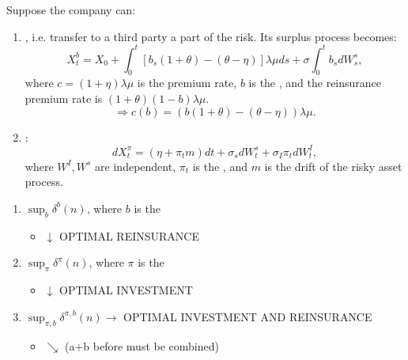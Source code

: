 Suppose the company can:

\begin{enumerate}[label=(\alph*)]
    \item {}, i.e. transfer to a third party a part of the risk. Its surplus process becomes:
    \begin{equation*}
        X_t^b = X_0 + \int_0^t [b_s(1+\theta) - (\theta - \eta)] \lambda \mu ds + \sigma \int_0^t b_s dW_s^s,
    \end{equation*}
    where $c = (1+\eta)\lambda \mu$ is the premium rate, $b$ is the , and the reinsurance premium rate is $(1+\theta)(1-b)\lambda \mu$.
    \begin{equation*}
        \Rightarrow c(b) = (b(1+\theta) - (\theta - \eta))\lambda \mu.
    \end{equation*}

    \item {}:
    \begin{equation*}
        dX_t^\pi = (\eta + \pi_t m) dt + \sigma_s dW_t^s + \sigma_I \pi_t dW_t^I,
    \end{equation*}
    where $W^I, W^s$ are independent, $\pi_t$ is the , and $m$ is the drift of the risky asset process.
\end{enumerate}

\begin{enumerate}[label=(\alph*)]
    \item $\sup_b \delta^b(n)$, where $b$ is the 
    \begin{itemize}
        \item[] {\color{red} $\downarrow$ OPTIMAL REINSURANCE}
    \end{itemize}

    \item $\sup_\pi \delta^\pi(n)$, where $\pi$ is the 
    \begin{itemize}
        \item[] {\color{red} $\downarrow$ OPTIMAL INVESTMENT}
    \end{itemize}

    \item $\sup_{\pi, b} \delta^{\pi, b}(n) \rightarrow$ {\color{red} OPTIMAL INVESTMENT AND REINSURANCE}
    \begin{itemize}
        \item[] $\searrow$ (a+b before must be combined)
    \end{itemize}
\end{enumerate}